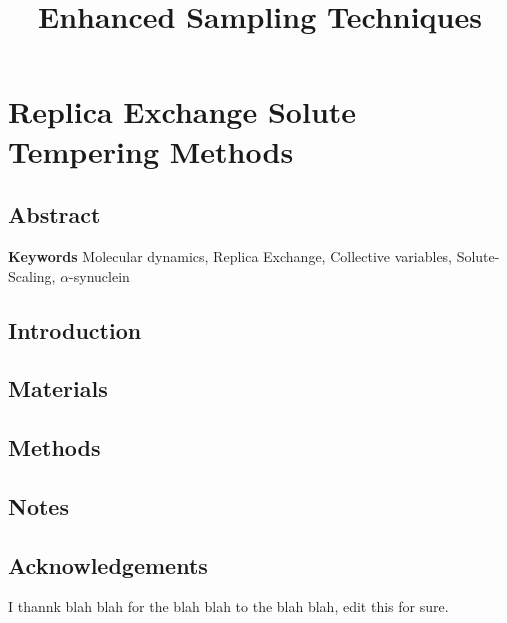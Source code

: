 \documentclass{memoir}
\title{Enhanced Sampling Techniques}
\begin{document}
\date{}

\maketitle

\tableofcontents

\chapter{Replica Exchange Solute Tempering Methods}

\section{Abstract}


\textbf{Keywords} Molecular dynamics, Replica Exchange, Collective variables, Solute-Scaling, $\alpha$-synuclein

\section{Introduction}

\begin{adjustwidth}{2in}{0in}
    




\end{adjustwidth}

\section{Materials}
\begin{adjustwidth}{2in}{0in}

\end{adjustwidth}
\section{Methods}
\begin{adjustwidth}{2in}{0in}



\end{adjustwidth}

\section{Notes}
\begin{adjustwidth}{1.7in}{0in}

\end{adjustwidth}



\section{Acknowledgements}
I thannk blah blah for the blah blah to the blah blah, edit this for sure.



\printbibliography[title={References}]
\end{document}
